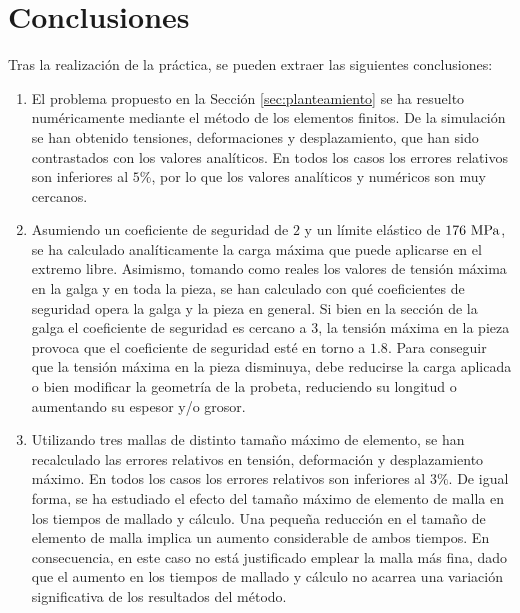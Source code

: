 
\section{Conclusiones}

Tras la realización de la práctica, se pueden extraer las siguientes conclusiones:

\begin{enumerate}
    \item El problema propuesto en la Sección \ref{sec:planteamiento} se ha resuelto numéricamente mediante el método de los elementos finitos. De la simulación se han obtenido tensiones, deformaciones y desplazamiento, que han sido contrastados con los valores analíticos. En todos los casos los errores relativos son inferiores al $5 \%$, por lo que los valores analíticos y numéricos son muy cercanos.
    \item Asumiendo un coeficiente de seguridad de $2$ y un límite elástico de $176 \ \mega\pascal$, se ha calculado analíticamente la carga máxima que puede aplicarse en el extremo libre. Asimismo, tomando como reales los valores de tensión máxima en la galga y en toda la pieza, se han calculado con qué coeficientes de seguridad opera la galga y la pieza en general. Si bien en la sección de la galga el coeficiente de seguridad es cercano a $3$, la tensión máxima en la pieza provoca que el coeficiente de seguridad esté en torno a $1.8$. Para conseguir que la tensión máxima en la pieza disminuya, debe reducirse la carga aplicada o bien modificar la geometría de la probeta, reduciendo su longitud o aumentando su espesor y/o grosor.
    \item Utilizando tres mallas de distinto tamaño máximo de elemento, se han recalculado las errores relativos en tensión, deformación y desplazamiento máximo. En todos los casos los errores relativos son inferiores al $3 \%$. De igual forma, se ha estudiado el efecto del tamaño máximo de elemento de malla en los tiempos de mallado y cálculo. Una pequeña reducción en el tamaño de elemento de malla implica un aumento considerable de ambos tiempos. En consecuencia, en este caso no está justificado emplear la malla más fina, dado que el aumento en los tiempos de mallado y cálculo no acarrea una variación significativa de los resultados del método.
\end{enumerate}
